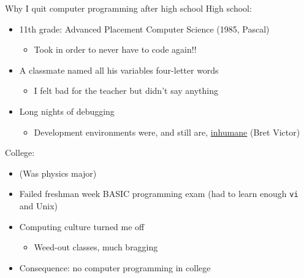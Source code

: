 \begin{frame}{Why I quit computer programming after high school}
  High school:
  \begin{itemize}
  \item 11th grade: Advanced Placement Computer Science (1985, Pascal)
    \begin{itemize}
    \item Took in order to never have to code again!!
    \end{itemize}
  \item A classmate named all his variables four-letter words
    \begin{itemize}
    \item I felt bad for the teacher but didn't say anything
    \end{itemize}
  \item Long nights of debugging
    \begin{itemize}
    \item Development environments were, and still are,
      \href{https://vimeo.com/115154289}{inhumane} (Bret Victor)
    \end{itemize}
  \end{itemize}

  College:
  \begin{itemize}
  \item (Was physics major)
  \item Failed freshman week BASIC programming exam (had to learn enough
    \texttt{vi} and Unix)
  \item Computing culture turned me off
    \begin{itemize}
    \item Weed-out classes, much bragging
    \end{itemize}
  \item Consequence: no computer programming in college
  \end{itemize}
\end{frame}



